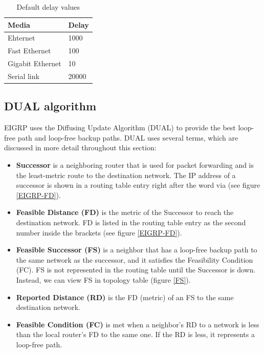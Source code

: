 \begin{table}[h!]
\centering
\caption{Default delay values}
\label{delay-value}
\begin{tabular}{|l|l|}
\hline
Media            & Delay \\ \hline
Ehternet         & 1000  \\ \hline
Fast Ethernet    & 100   \\ \hline
Gigabit Ethernet & 10    \\ \hline
Serial link      & 20000 \\ \hline
\end{tabular}
\end{table}

\subsection{DUAL algorithm}

EIGRP uses the Diffusing Update Algorithm (DUAL) to provide the best loop-free path and loop-free backup paths. DUAL uses several terms, which are discussed in more detail throughout this section:

\begin{itemize}
\item \textbf{Successor} is a neighboring router that is used for packet forwarding and is the least-metric route to the destination network. The IP address of a successor is shown in a routing table entry right after the word via (see figure \ref{EIGRP-FD}). 

\item \textbf{Feasible Distance (FD)} is the metric of the Successor to reach the destination network. FD is listed in the routing table entry as the second number inside the brackets (see figure \ref{EIGRP-FD}).

\item \textbf{Feasible Successor (FS)} is a neighbor that has a loop-free backup path to the same network as the successor, and it satisfies the Feasibility Condition (FC). FS is not represented in the routing table until the Successor is down. Instead, we can view FS in topology table (figure \ref{FS}).

\item \textbf{Reported Distance (RD)} is the FD (metric) of an FS to the same destination network.

\item \textbf{Feasible Condition (FC)} is met when a neighbor's RD to a network is less than the local router's FD to the same one. If the RD is less, it represents a loop-free path. 
\end{itemize}

